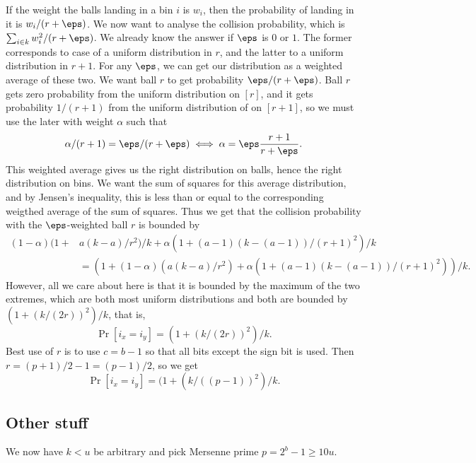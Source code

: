 If the weight the balls landing in a bin $i$ is $w_i$, then the probability
of landing in it is $w_i/(r+\eps)$. We now want to
analyse the collision probability, which is $\sum_{i\in k} w_i^2/(r+\eps)$.
We already know the answer if $\eps$ is $0$ or $1$. The former corresponds
to case of a uniform distribution in $r$, and the latter to a uniform
distribution in $r+1$. For any $\eps$, we can get our distribution as
a weighted average of these two. We want ball $r$ to get probability $\eps/(r+\eps)$.
Ball $r$ gets zero probability from the uniform distribution on $[r]$, and it gets
probability $1/(r+1)$ from the uniform distribution of on $[r+1]$, so we
must use the later with weight $\alpha$ such that 
\[\alpha/(r+1)=\eps/(r+\eps)\iff \alpha=\eps\frac{r+1}{r+\eps}.\]
This weighted average gives us the right distribution on balls, hence the
right distribution on bins. We want the sum of squares for this average distribution,
and by Jensen's inequality, this is less than or equal to the corresponding
weigthed average of the sum of squares. Thus we
get that the collision probability with the $\eps$-weighted ball $r$ is
bounded by 
\begin{align*}
(1-\alpha)(1+&a(k-a)/r^2)/k+\alpha (1+(a-1)(k-(a-1))/(r+1)^2)/k\\
&=(1+(1-\alpha)(a(k-a)/r^2)+\alpha (1+(a-1)(k-(a-1))/(r+1)^2))/k.
\end{align*}
However, all we care about here is that it is bounded by the maximum 
of the two extremes, which are both most uniform distributions
and both are bounded by $(1+(k/(2r))^2)/k$, that is,
\begin{equation}\label{eq:collision-r}
\Pr[i_x=i_y]=(1+(k/(2r))^2)/k.
\end{equation}
Best use of $r$ is to use $c=b-1$ so that all bits except the sign bit is used.
Then $r=(p+1)/2-1=(p-1)/2$, so we get
\begin{equation}\label{eq:collision-p}
\Pr[i_x=i_y]=(1+(k/((p-1))^2)/k.
\end{equation}


\subsection{Other stuff}
We now have $k< u$ be arbitrary and pick Mersenne prime $p=2^b-1\geq 10 u$.

